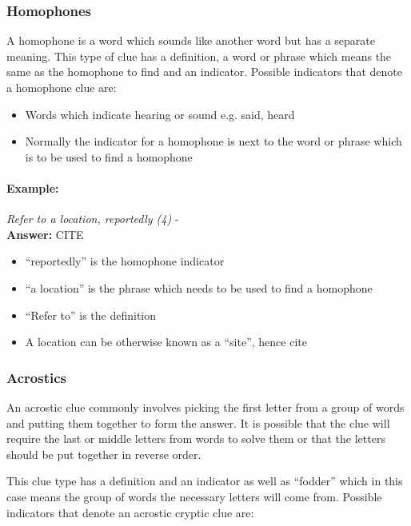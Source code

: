 \subsubsection{Homophones}

A homophone is a word which sounds like another word but has a separate meaning.
This type of clue has a definition, a word or phrase which means the same as the
homophone to find and an indicator. Possible indicators that denote a homophone
clue are:

\begin{itemize} 
  \item Words which indicate hearing or sound e.g. said, heard 
  \item Normally the indicator for a homophone is next to the word or phrase
        which is to be used to find a homophone  
\end{itemize}

\paragraph{Example:} \emph{Refer to a location, reportedly (4)} - \citep{shuchiHomophone08} \\
\textbf{Answer:} CITE 

\begin{itemize}
  \item ``reportedly'' is the homophone indicator 
  \item ``a location'' is the phrase which needs to be used to find a homophone 
  \item ``Refer to'' is the definition 
  \item A location can be otherwise known as a ``site'', hence cite 
\end{itemize}


\subsubsection{Acrostics}

An acrostic clue commonly involves picking the first letter from a group of
words and putting them together to form the answer. It is possible that the clue
will require the last or middle letters from words to solve them or that the
letters should be put together in reverse order.

This clue type has a definition and an indicator as well as ``fodder'' which in
this case means the group of words the necessary letters will come from.
Possible indicators that denote an acrostic cryptic  clue are:

